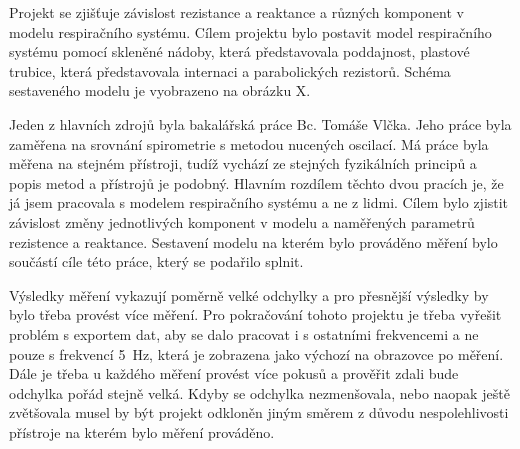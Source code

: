 Projekt se zjišťuje závislost rezistance a reaktance a různých komponent v modelu respiračního systému. 
Cílem projektu bylo postavit model respiračního systému pomocí skleněné nádoby, která představovala poddajnost, plastové trubice, která představovala internaci a parabolických rezistorů.  Schéma sestaveného modelu je vyobrazeno na obrázku X. 

Jeden z hlavních zdrojů byla bakalářská práce Bc. Tomáše Vlčka. Jeho práce byla zaměřena na srovnání spirometrie s metodou nucených oscilací. Má práce byla měřena na stejném přístroji, tudíž vychází ze stejných fyzikálních principů a popis metod a přístrojů je podobný. Hlavním rozdílem těchto dvou pracích je, že já jsem pracovala s modelem respiračního systému a ne z lidmi. Cílem bylo zjistit závislost změny jednotlivých komponent v modelu a naměřených parametrů rezistence a reaktance. Sestavení modelu na kterém bylo prováděno měření bylo součástí cíle této práce, který se podařilo splnit. 

Výsledky měření vykazují poměrně velké odchylky a pro přesnější výsledky by bylo třeba provést více měření. Pro pokračování tohoto projektu je třeba vyřešit problém s exportem dat, aby se dalo pracovat i s ostatními frekvencemi a ne pouze s frekvencí \SI{5}{Hz}, která je zobrazena jako výchozí na obrazovce po měření. Dále je třeba u každého měření provést více pokusů a prověřit zdali bude odchylka pořád stejně velká. Kdyby se odchylka nezmenšovala, nebo naopak ještě zvětšovala musel by být projekt odkloněn  jiným směrem z důvodu nespolehlivosti přístroje na kterém bylo měření prováděno. 
